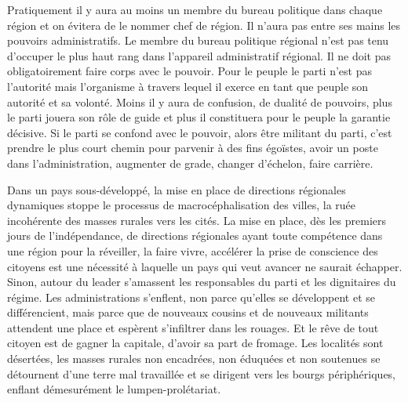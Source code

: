 \documentclass[french,twoside]{book} %
\begin{document}
\bigbreak
\noindent Pratiquement il y aura au moins un membre du bureau politique dans chaque région et on évitera de le nommer chef de région. Il n’aura pas entre ses mains les pouvoirs administratifs. Le membre du bureau politique régional n’est pas tenu d’occuper le plus haut rang dans l’appareil administratif régional. Il ne doit pas obligatoirement faire corps avec le pouvoir. Pour le peuple le parti n’est pas l’autorité mais l’organisme à travers lequel il exerce en tant que peuple son autorité et sa volonté. Moins il y aura de confusion, de dualité de pouvoirs, plus le parti jouera son rôle de guide et plus il constituera pour le peuple la garantie décisive. Si le parti se confond avec le pouvoir, alors être militant du parti, c’est prendre le plus court chemin pour parvenir à des fins égoïstes, avoir un poste dans l’administration, augmenter de grade, changer d’échelon, faire carrière.\par
\bigbreak
\noindent Dans un pays sous-développé, la mise en place de directions régionales dynamiques stoppe le processus de macrocéphalisation des villes, la ruée incohérente des masses rurales vers les cités. La mise en place, dès les premiers jours de l’indépendance, de directions régionales ayant toute compétence dans une région pour la réveiller, la faire vivre, accélérer la prise de conscience des citoyens est une nécessité à laquelle un pays qui veut avancer ne saurait échapper. Sinon, autour du leader s’amassent les responsables du parti et les dignitaires du régime. Les administrations s’enflent, non parce qu’elles se développent et se différencient, mais parce que de nouveaux cousins et de nouveaux militants attendent une place et espèrent s’infiltrer dans les rouages. Et le rêve de tout citoyen est de gagner la   capitale, d’avoir sa part de fromage. Les localités sont désertées, les masses rurales non encadrées, non éduquées et non soutenues se détournent d’une terre mal travaillée et se dirigent vers les bourgs périphériques, enflant démesurément le lumpen-prolétariat.\par
\bigbreak
\end{document}
